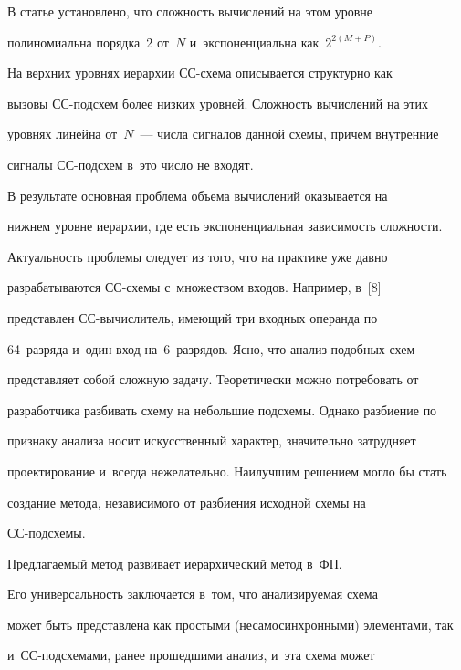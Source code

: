    В статье установлено, что сложность вычислений на этом уровне 


полиномиальна порядка~2 от~$N$ и~экспоненциальна как~$2^{2(M+P)}$.


   


   На верхних уровнях иерархии СС-схема описывается структурно как 


вызовы СС-под\-схем более низких уровней. Сложность вычислений на этих 


уровнях линейна от~$N$~--- числа сигналов данной схемы, причем внутренние 


сигналы СС-под\-схем в~это число не входят.


   


   В результате основная проблема объема вычислений оказывается на 


нижнем уровне иерархии, где есть экспоненциальная зависимость сложности.


   


   Актуальность проблемы следует из того, что на практике уже давно 


разрабатываются СС-схе\-мы с~множеством входов. Например, в~[8] 


представлен СС-вы\-чис\-ли\-тель, имеющий три входных операнда по 


64~разряда и~один вход на~6~разрядов. Ясно, что анализ подобных схем 


представляет собой сложную задачу. Теоретически можно потребовать от 


разработчика разбивать схему на небольшие подсхемы. Однако разбиение по 


признаку анализа носит искусственный характер, значительно затрудняет 


проектирование и~всегда нежелательно. Наилучшим решением могло бы стать 


создание метода, независимого от разбиения исходной схемы на  


СС-под\-схемы.


   


   Предлагаемый метод развивает иерархический метод в~ФП. 


   Его универсальность заключается в~том, что анализируемая схема 


может быть представлена как простыми (несамосинхронными) элементами, так 


и~СС-под\-схе\-ма\-ми, ранее прошедшими анализ, и~эта схема может 


